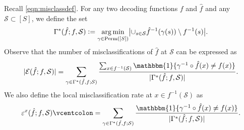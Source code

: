 \documentclass[11pt]{article}
\newcommand{\eqdef}{\vcentcolon=}
\newcommand{\mcE}{\mathcal{E}}
\newcommand{\mcS}{\mathcal{S}}
\DeclareMathOperator*{\argmin}{arg\,min}
\theoremstyle{definition}
\theoremstyle{definition}
\begin{document}
Recall \eqref{eqn:misclassdef}.
For any two decoding functions $f$ and $\hat{f}$ and any $\mcS\subset[S]$, we define the set
\begin{equation}
	\Gamma^*(\hat{f};f,\mcS)
	\eqdef
	\argmin_{\gamma\in \mathrm{Perm}([S])}
	\bigl|\cup_{s\in \mcS}\hat{f}^{-1}(\gamma(s))\setminus f^{-1}(s)\bigr|
	.
\end{equation}
Observe that the number of misclassifications of $\hat{f}$ at $\mcS$ can be expressed as
\begin{equation}
	|\mcE(\hat{f};f,\mcS)|
	=
	\sum_{\gamma\in\Gamma^*(\hat{f},f;\mcS)}
	\frac{\sum_{x\in f^{-1}(\mcS)}\mathbbm{1}\{\gamma^{-1}\circ \hat{f}(x)\neq f(x)\}}{|\Gamma^*(\hat{f};f,\mcS)|}
	.
\end{equation}
We also define the local misclassification rate at $x\in f^{-1}(\mcS)$ as
\begin{equation}
	\label{eqn:local_misclassification_rate_definition}
	\varepsilon^x(\hat{f};f,\mcS)
	\eqdef
	\sum_{\gamma \in\Gamma^*(\hat{f},f;\mcS)}
	\frac{\mathbbm{1}\{\gamma^{-1}\circ \hat{f}(x)\neq f(x)\}}{|\Gamma^*(\hat{f};f,\mcS)|}
	.
\end{equation}
\end{document}
